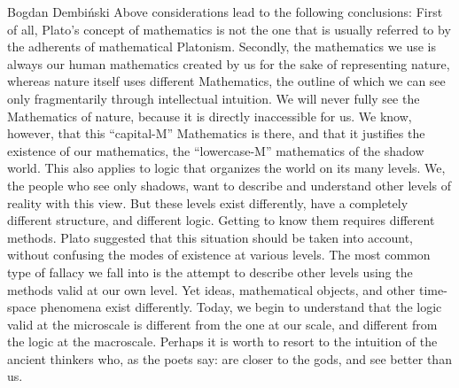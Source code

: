 \begin{artengenv}{Bogdan Dembiński}
Above considerations lead to the following conclusions: First of all, Plato’s concept of mathematics is not the one that
is usually referred to by the adherents of mathematical Platonism. Secondly, the mathematics we use is always our human
mathematics created by us for the sake of representing nature, whereas nature itself uses different Mathematics, the
outline of which we can see only fragmentarily through intellectual intuition. We will never fully see the Mathematics
of nature, because it is directly inaccessible for us. We know, however, that this ``capital-M'' Mathematics is there,
and that it justifies the existence of our mathematics, the ``lowercase-M'' mathematics of the shadow world. This also
applies to logic that organizes the world on its many levels. We, the people who see only shadows, want to describe and
understand other levels of reality with this view. But these levels exist differently, have a completely different
structure, and different logic. Getting to know them requires different methods. Plato suggested that this situation
should be taken into account, without confusing the %
modes of existence at various levels. The most common type of fallacy we fall into is the attempt to describe other levels
using the methods valid at our own level.  Yet ideas, mathematical objects, and other time-space phenomena %
exist differently. %
Today, we begin to understand that the logic valid at the microscale is different from the one at our scale, and
different from the logic at the macroscale. Perhaps it is worth to resort to the intuition of the ancient thinkers who,
as the poets say: are closer to the gods, and see better than us. 




\end{artengenv}
